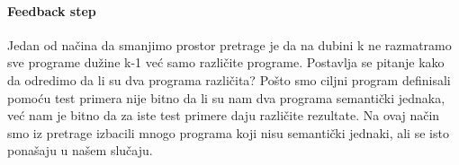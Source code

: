 \paragraph{Feedback step}
Jedan od načina da smanjimo prostor pretrage je da na dubini k ne razmatramo sve programe dužine k-1 već samo različite programe. Postavlja se pitanje kako da odredimo da li su dva programa različita? Pošto smo ciljni program definisali pomoću test primera nije bitno da li su nam dva programa semantički jednaka, već nam je bitno da  za iste test primere daju različite rezultate. Na ovaj način smo iz pretrage izbacili mnogo programa koji nisu
semantički jednaki, ali se isto ponašaju u našem slučaju.
